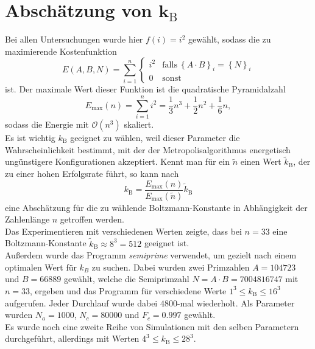 \section{\texorpdfstring{Abschätzung von $\bm{k_\mathrm{B}}$}{Abschätzung von kB}}\label{sec:kbguess}
Bei allen Untersuchungen wurde hier $f\left(i\right)=i^2$ gewählt, sodass die zu maximierende Kostenfunktion
\begin{equation*}
		E\left(A,B,N\right)=\sum\limits_{i=1}^n\begin{cases}
    i^2 & \mathrm{falls}\:{\left\{A\cdot B\right\}}_i={\left\{N\right\}}_i \\
	0 & \mathrm{sonst}
  \end{cases}
\end{equation*}
ist. Der maximale Wert dieser Funktion ist die quadratische Pyramidalzahl~\parencite{oeis}
\begin{equation*}
		E_{\mathrm{\max}}\left(n\right)=\sum\limits_{i=1}^n i^2=\frac{1}{3}n^3+\frac{1}{2}n^2+\frac{1}{6}n,\label{eq:kbguess}
\end{equation*}
sodass die Energie mit $\mathcal{O}\left(n^3\right)$ skaliert. \\
Es ist wichtig $k_\mathrm{B}$ geeignet zu wählen, weil dieser Parameter die Wahrscheinlichkeit bestimmt, mit der der Metropolisalgorithmus energetisch ungünstigere Konfigurationen akzeptiert. Kennt man für ein $\tilde{n}$ einen Wert $\tilde{k}_\mathrm{B}$, der zu einer hohen Erfolgsrate  führt, so kann nach
\begin{equation*}
		k_\mathrm{B}=\frac{E_{\mathrm{\max}}\left(n\right)}{E_{\mathrm{\max}}\left(\tilde{n}\right)}\tilde{k}_\mathrm{B}
\end{equation*}
eine Abschätzung für die zu wählende Boltzmann-Konstante in Abhängigkeit der Zahlenlänge $n$ getroffen werden. \\
Das Experimentieren mit verschiedenen Werten zeigte, dass bei $n=33$ eine Boltzmann-Konstante $\tilde{k}_\mathrm{B}\approx 8^3=512$ geeignet ist. \\
Außerdem wurde das Programm \textit{semiprime} verwendet, um gezielt nach einem optimalen Wert für $k_B$ zu suchen. Dabei wurden zwei Primzahlen $A=104723$ und $B=66889$ gewählt, welche die Semiprimzahl $N=A\cdot B=7004816747$ mit $n=33$, ergeben und das Programm für verschiedene Werte $1^3\leq k_\mathrm{B}\leq 16^3$ aufgerufen. Jeder Durchlauf wurde dabei $4800$-mal wiederholt. Als Parameter wurden $N_a=1000$, $N_c=80000$ und $F_c=0.997$ gewählt. \\
Es wurde noch eine zweite Reihe von Simulationen mit den selben Parametern durchgeführt, allerdings mit Werten $4^3\leq k_\mathrm{B} \leq 28^3$.

